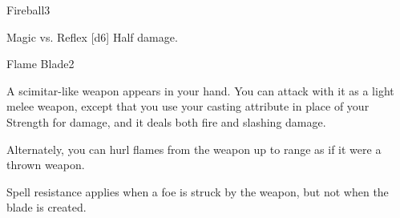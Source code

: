 \begin{spellsection}{Fireball}{3}
\begin{spellheader}
\end{spellheader}
\begin{spellcontent}
    \begin{spelltargetinginfo}
    \end{spelltargetinginfo}
    \begin{spelleffects}
        \begin{spellattack}{Magic vs. Reflex}
            \spellsuccess {}[d6]
            \spellfailure Half damage.
        \end{spellattack}
    \end{spelleffects}
\end{spellcontent}
\begin{spellfooter}
    \spellnotes \destructivespellnotes

    \firespellnotes
\end{spellfooter}
\end{spellsection}

\begin{spellsection}{Flame Blade}{2}
\begin{spellheader}
\end{spellheader}
\begin{spellcontent}
    \begin{spelleffects}
        \spelleffect A scimitar-like weapon appears in your hand. You can attack with it as a light melee weapon, except that you use your casting attribute in place of your Strength for damage, and it deals both fire and slashing damage.

        Alternately, you can hurl flames from the weapon up to \rngmed range as if it were a thrown weapon.

        \spelldur \durlong \dismissable
    \end{spelleffects}
\end{spellcontent}
\begin{spellfooter}
    \spellnotes Spell resistance applies when a foe is struck by the weapon, but not when the blade is created.
    \firespellnotes
\end{spellfooter}
\end{spellsection}

